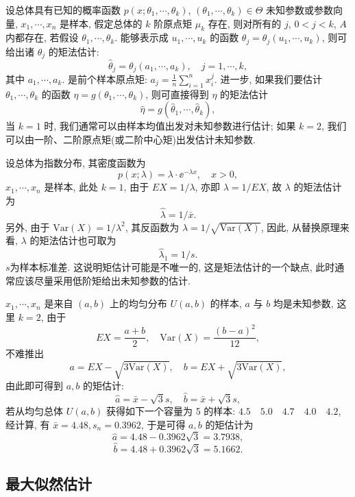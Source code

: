 设总体具有已知的概率函数 $p(x;\theta_1,\cdots,\theta_k)$, $(\theta_1,\cdots,\theta_k)\in \Theta$ 未知参数或参数向量,  $x_1,\cdots,x_n$ 是样本, 假定总体的 $k$ 阶原点矩 $\mu_k$ 存在, 则对所有的 $j$, 
$0<j<k$, $A$ 内都存在, 若假设 $\theta_1,\cdots,\theta_k$. 能够表示成 $u_1,\cdots,u_k$ 的函数 $\theta_j=\theta_j(u_1,\cdots,u_k)$, 则可给出诸 $\theta_j$ 的矩法估计:
\begin{equation}
\hat{\theta}_j=\theta_j(a_1,\cdots,a_k),\quad j=1,\cdots,k,
\end{equation}
其中 $a_1,\cdots,a_k$. 是前个样本原点矩: $a_j=\frac{1}{n}\sum_{i=1}^{n}x_i^j$. 进一步, 如果我们要估计 $\theta_1,\cdots,\theta_k$
的函数 $\eta=g(\theta_1,\cdots,\theta_k)$, 则可直接得到 $\eta$ 的矩法估计
\begin{equation}
\hat{\eta}=g(\hat{\theta}_1,\cdots,\hat{\theta}_k),
\end{equation}
当 $k=1$ 时, 我们通常可以由样本均值出发对未知参数进行估计; 如果 $k=2$, 我们可以由一阶、二阶原点矩(或二阶中心矩)出发估计未知参数.

\begin{example}
设总体为指数分布, 其密度函数为
\[p(x;\lambda)=\lambda\cdot\ee^{-\lambda x},\quad x>0, \]
$x_1,\cdots,x_n$ 是样本, 此处 $k=1$, 由于 $EX=1/\lambda$, 亦即 $\lambda=1/EX$, 故 $\lambda$ 的矩法估计为
\[\hat{\lambda}=1/\bar{x}. \]
另外, 由于 $\mathrm{Var}(X)=1/\lambda^2$, 其反函数为 $\lambda=1/\sqrt{\mathrm{Var}(X)}$, 因此, 从替换原理来看, $\lambda$ 的矩法估计也可取为
\[\hat{\lambda}_1=1/s. \] 
$s$为样本标准差. 这说明矩估计可能是不唯一的, 这是矩法估计的一个缺点, 此时通常应该尽量采用低阶矩给出未知参数的估计.
\end{example}

\begin{example}
$x_1,\cdots,x_n$ 是来自 $(a,b)$ 上的均匀分布 $U(a,b)$ 的样本, $a$ 与 $b$ 均是未知参数, 这里 $k=2$, 由于
\[EX=\frac{a+b}{2},\quad\mathrm{Var}(X)=\frac{(b-a)^2}{12}, \]
不难推出
\[a=EX-\sqrt{3\mathrm{Var}(X)},\quad b=EX+\sqrt{3\mathrm{Var}(X)}, \]
由此即可得到 $a,b$ 的矩估计:
\[\hat{a}=\bar{x}-\sqrt{3}s,\quad\hat{b}=\bar{x}+\sqrt{3}s, \]
若从均匀总体 $U(a,b)$ 获得如下一个容量为 5 的样本: $4.5\quad5.0\quad4.7\quad4.0\quad4.2$, 经计算, 有 $\bar{x}=4.48,s_n=0.3962$, 于是可得 $a,b$ 的矩估计为
\[\hat{a}=4.48-0.3962\sqrt{3}=3.7938,\]
\[\hat{b}=4.48+0.3962\sqrt{3}=5.1662.\]
\end{example}

\subsection{最大似然估计}%

